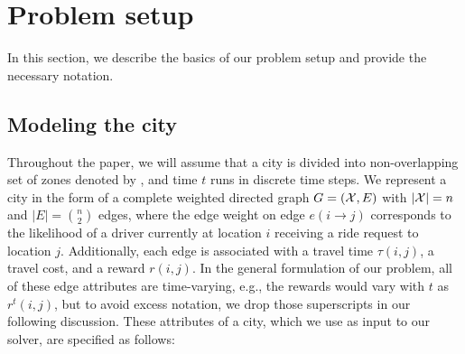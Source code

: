 
\section{Problem setup}
\label{sec:problem_setup}

In this section, we describe the basics of our problem setup and provide the necessary notation.

\iffalse
\subsection{Notation}
\label{sec:notation}

Vectors are denoted with lowercase bold letters (e.g., $\vec{a} = [a(i)]$) and matrices are denoted with uppercase bold letters (e.g., $\matr{A} = [a(i,j)]$). The notation $\vec{1}$ refers to the vector of ones, with size dependent on the context. The short form notation $\vec{A_i}$ refers to the $i$-th row vector of the matrix $\matr{A}$. Let $\Theta_n$ be a set of $n \times n$ right-stochastic transition matrices (non-negative matrices with rows that sum to one). A probability simplex in $\mathbb{R}^n$ is denoted by $\Delta_n = \{\vec{p} \in \mathbb{R}^n_+ : \transpose{p} \vec{1} = 1 \}$.
\fi

\subsection{Modeling the city}

Throughout the paper, we will assume that a city is divided into non-overlapping set of zones denoted 
by \cityzones, and time $t$ runs in discrete time steps.
We represent a city in the form of a complete weighted directed graph $G=(\mathcal{X}, E)$ with 
$|\mathcal{X}| = n$ and $|E| = {n \choose 2}$ edges, where the edge weight on 
edge $e(i\rightarrow j)$ corresponds to the likelihood of a driver currently at 
location $i$ receiving a ride request to location $j$.  Additionally, each edge is
associated with a travel time $\tau(i, j)$, a travel cost, and a reward $r(i,j)$.
In the general formulation of our problem, all of these edge attributes are time-varying,
e.g., the rewards would vary with $t$ as $r^t(i,j)$, but to avoid excess notation, we drop
those superscripts in our following discussion.  These attributes of a city, which we use as 
input to our solver, are specified as follows:




